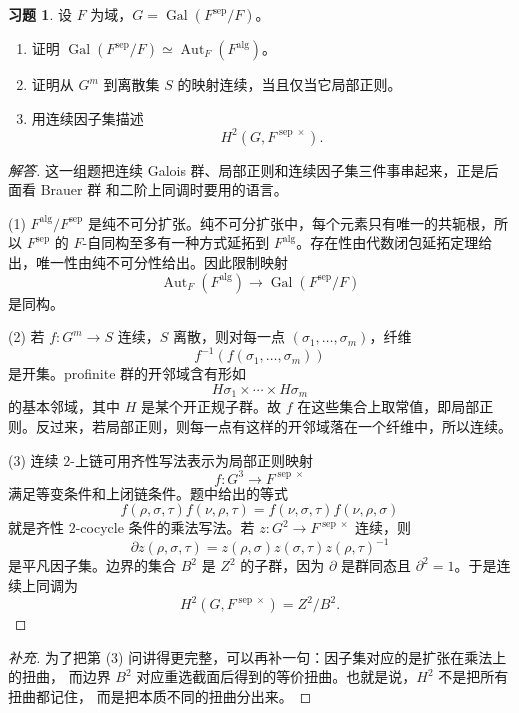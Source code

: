 \documentclass[11pt,a4paper,openany]{ctexbook}
\numberwithin{equation}{chapter}
\theoremstyle{plain}
\theoremstyle{definition}
\newtheorem{exercise}[theorem]{习题}
\theoremstyle{remark}
\begin{document}
\begin{exercise}
设 $F$ 为域，$G=\operatorname{Gal}(F^{\operatorname{sep}}/F)$。
\begin{enumerate}[label=(\arabic*)]
\item 证明 $\operatorname{Gal}(F^{\operatorname{sep}}/F)\simeq \operatorname{Aut}_F(F^{\operatorname{alg}})$。
\item 证明从 $G^m$ 到离散集 $S$ 的映射连续，当且仅当它局部正则。
\item 用连续因子集描述
\[
 H^2(G,F^{\operatorname{sep}\times}).
\]
\end{enumerate}
\end{exercise}

\begin{proof}[解答]
这一组题把连续 Galois 群、局部正则和连续因子集三件事串起来，正是后面看 Brauer 群
和二阶上同调时要用的语言。

(1) $F^{\operatorname{alg}}/F^{\operatorname{sep}}$ 是纯不可分扩张。纯不可分扩张中，每个元素只有唯一的共轭根，所以 $F^{\operatorname{sep}}$ 的 $F$-自同构至多有一种方式延拓到 $F^{\operatorname{alg}}$。存在性由代数闭包延拓定理给出，唯一性由纯不可分性给出。因此限制映射
\[
 \operatorname{Aut}_F(F^{\operatorname{alg}})
 \to \operatorname{Gal}(F^{\operatorname{sep}}/F)
\]
是同构。

(2) 若 $f:G^m\to S$ 连续，$S$ 离散，则对每一点 $(\sigma_1,\ldots,\sigma_m)$，纤维
\[
 f^{-1}(f(\sigma_1,\ldots,\sigma_m))
\]
是开集。profinite 群的开邻域含有形如
\[
 H\sigma_1\times\cdots\times H\sigma_m
\]
的基本邻域，其中 $H$ 是某个开正规子群。故 $f$ 在这些集合上取常值，即局部正则。反过来，若局部正则，则每一点有这样的开邻域落在一个纤维中，所以连续。

(3) 连续 $2$-上链可用齐性写法表示为局部正则映射
\[
 f:G^3\to F^{\operatorname{sep}\times}
\]
满足等变条件和上闭链条件。题中给出的等式
\[
 f(\rho,\sigma,\tau)f(\nu,\rho,\tau)
 =
 f(\nu,\sigma,\tau)f(\nu,\rho,\sigma)
\]
就是齐性 $2$-cocycle 条件的乘法写法。若 $z:G^2\to F^{\operatorname{sep}\times}$ 连续，则
\[
 \partial z(\rho,\sigma,\tau)=z(\rho,\sigma)z(\sigma,\tau)z(\rho,\tau)^{-1}
\]
是平凡因子集。边界的集合 $B^2$ 是 $Z^2$ 的子群，因为 $\partial$ 是群同态且 $\partial^2=1$。于是连续上同调为
\[
 H^2(G,F^{\operatorname{sep}\times})=Z^2/B^2.
\]
\end{proof}

\begin{proof}[补充]
为了把第 (3) 问讲得更完整，可以再补一句：因子集对应的是扩张在乘法上的扭曲，
而边界 $B^2$ 对应重选截面后得到的等价扭曲。也就是说，$H^2$ 不是把所有扭曲都记住，
而是把本质不同的扭曲分出来。
\end{proof}
\end{document}
